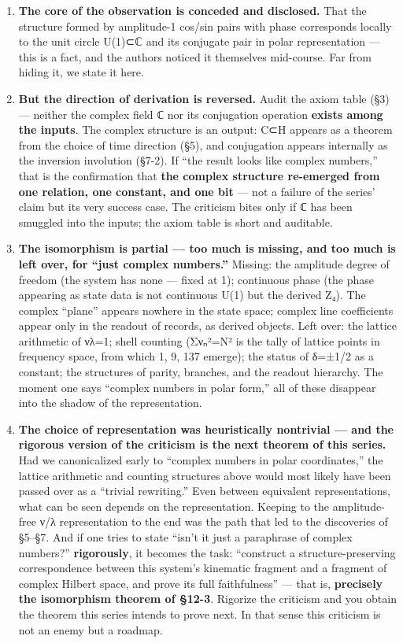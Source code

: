 \documentclass[
]{article}
\newcounter{none} %
\begin{document}
\begin{enumerate}
\def\labelenumi{\arabic{enumi}.}
\item
  \textbf{The core of the observation is conceded and disclosed.} That
  the structure formed by amplitude-1 cos/sin pairs with phase
  corresponds locally to the unit circle U(1)⊂ℂ and its conjugate pair
  in polar representation --- this is a fact, and the authors noticed it
  themselves mid-course. Far from hiding it, we state it here.
\item
  \textbf{But the direction of derivation is reversed.} Audit the axiom
  table (§3) --- neither the complex field ℂ nor its conjugation
  operation \textbf{exists among the inputs}. The complex structure is
  an output: C⊂H appears as a theorem from the choice of time direction
  (§5), and conjugation appears internally as the inversion involution
  (§7-2). If ``the result looks like complex numbers,'' that is the
  confirmation that \textbf{the complex structure re-emerged from one
  relation, one constant, and one bit} --- not a failure of the series'
  claim but its very success case. The criticism bites only if ℂ has
  been smuggled into the inputs; the axiom table is short and auditable.
\item
  \textbf{The isomorphism is partial --- too much is missing, and too
  much is left over, for ``just complex numbers.''} Missing: the
  amplitude degree of freedom (the system has none --- fixed at 1);
  continuous phase (the phase appearing as state data is not continuous
  U(1) but the derived Z₄). The complex ``plane'' appears nowhere in the
  state space; complex line coefficients appear only in the readout of
  records, as derived objects. Left over: the lattice arithmetic of
  νλ=1; shell counting (Σνₙ²=N² is the tally of lattice points in
  frequency space, from which 1, 9, 137 emerge); the status of δ=±1/2 as
  a constant; the structures of parity, branches, and the readout
  hierarchy. The moment one says ``complex numbers in polar form,'' all
  of these disappear into the shadow of the representation.
\item
  \textbf{The choice of representation was heuristically nontrivial ---
  and the rigorous version of the criticism is the next theorem of this
  series.} Had we canonicalized early to ``complex numbers in polar
  coordinates,'' the lattice arithmetic and counting structures above
  would most likely have been passed over as a ``trivial rewriting.''
  Even between equivalent representations, what can be seen depends on
  the representation. Keeping to the amplitude-free ν/λ representation
  to the end was the path that led to the discoveries of §5--§7. And if
  one tries to state ``isn't it just a paraphrase of complex numbers?''
  \textbf{rigorously}, it becomes the task: ``construct a
  structure-preserving correspondence between this system's kinematic
  fragment and a fragment of complex Hilbert space, and prove its full
  faithfulness'' --- that is, \textbf{precisely the isomorphism theorem
  of §12-3}. Rigorize the criticism and you obtain the theorem this
  series intends to prove next. In that sense this criticism is not an
  enemy but a roadmap.
\end{enumerate}
\end{document}
